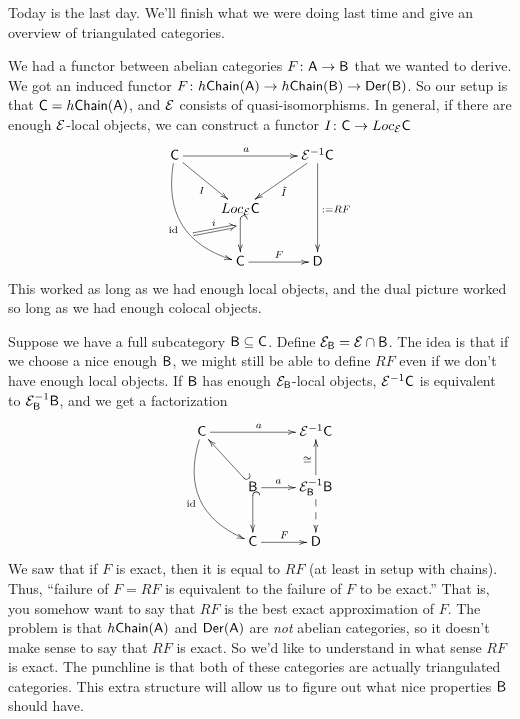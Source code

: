 
Today is the last day. We'll finish what we were doing last time and give an overview of triangulated categories.

We had a functor between abelian categories $F\colon \text{\sf A}\to \text{\sf B}$ that we wanted to derive. We got an induced functor $F\colon h\text{\sf Chain}(\text{\sf A})\to h\text{\sf Chain}(\text{\sf B})\to \operatorname{\sf Der}(\text{\sf B})$. So our setup is that $\text{\sf C}=h\text{\sf Chain}(\text{\sf A})$, and $\mathcal{E}$ consists of quasi-isomorphisms. In general, if there are enough $\mathcal{E}$-local objects, we can construct a functor $I\colon \text{\sf C}\to Loc_{\mathcal{E}}\text{\sf C}$
\[\xymatrix{
 \C\ar@/_5ex/[ddr]_\id^(.6){}="a" \ar[rr]^a \ar[dr]_I & & \E^{-1}\C\ar[dl]^{\tilde I} \ar[dd]^{:=RF}\\
 & Loc_\E\C \ar@{^(->}[d]_(.3){}="b"\\
 & \C\ar[r]^F & \D
 \ar@{=>}^i "a";"b"
}\]
This worked as long as we had enough local objects, and the dual picture worked so long as we had enough colocal objects.

Suppose we have a full subcategory $\text{\sf B}\subseteq \text{\sf C}$. Define $\mathcal{E}_{\text{\sf B}}=\mathcal{E}\cap \text{\sf B}$. The idea is that if we choose a nice enough $\text{\sf B}$, we might still be able to define $RF$ even if we don't have enough local objects. If $\text{\sf B}$ has enough $\mathcal{E}_{\text{\sf B}}$-local objects, $\mathcal{E}^{-1}\text{\sf C}$ is equivalent to $\mathcal{E}_{\text{\sf B}}^{-1}\text{\sf B}$, and we get a factorization
\[\xymatrix{
 \C\ar@/_5ex/[ddr]_\id \ar[rr]^a & & \E^{-1}\C\\
 & \B \ar@{_(->}[ul] \ar@{^(->}[d] \ar[r]^-a & \E_\B^{-1}\B \ar[u]^\cong \ar@{-->}[d] \\
 & \C\ar[r]^F & \D
}\]
We saw that if $F$ is exact, then it is equal to $RF$ (at least in setup with chains). Thus, ``failure of $F=RF$ is equivalent to the failure of $F$ to be exact.'' That is, you somehow want to say that $RF$ is the best exact approximation of $F$. The problem is that $h\text{\sf Chain}(\text{\sf A})$ and $\operatorname{\sf Der}(\text{\sf A})$ are \emph{not} abelian categories, so it doesn't make sense to say that $RF$ is exact. So we'd like to understand in what sense $RF$ is exact. The punchline is that both of these categories are actually triangulated categories. This extra structure will allow us to figure out what nice properties $\text{\sf B}$ should have.

